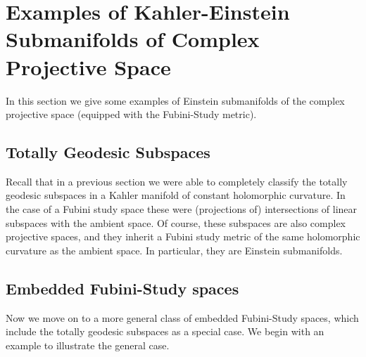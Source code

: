 \section{Examples of Kahler-Einstein Submanifolds of Complex Projective Space}

In this section we give some examples of Einstein submanifolds of the complex projective space (equipped with the Fubini-Study metric).

\subsection{Totally Geodesic Subspaces}

Recall that in a previous section we were able to completely classify the totally geodesic subspaces in a Kahler manifold of constant holomorphic curvature.  In the case of a Fubini study space these were (projections of) intersections of linear subspaces with the ambient space.  Of course, these subspaces are also complex projective spaces, and they inherit a Fubini study metric of the same holomorphic curvature as the ambient space.  In particular, they are Einstein submanifolds. 

\subsection{Embedded Fubini-Study spaces}

Now we move on to a more general class of embedded Fubini-Study spaces, which include the totally geodesic subspaces as a special case.  We begin with an example to illustrate the general case.

